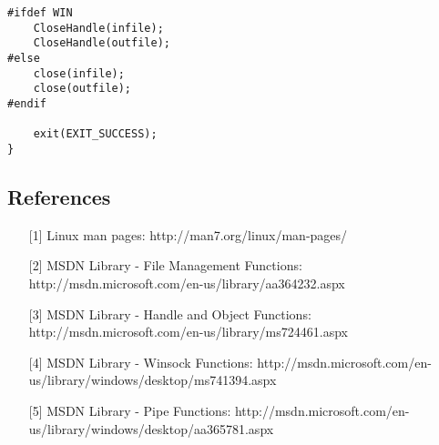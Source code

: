 \documentclass[letterpaper,10pt,fleqn]{article}
\numberwithin{equation}{section}
\begin{document}
\begin{verbatim}
#ifdef WIN
    CloseHandle(infile);
    CloseHandle(outfile);
#else
    close(infile);
    close(outfile);
#endif

    exit(EXIT_SUCCESS);
}
\end{verbatim}

\subsection*{References}

\begin{itemize}
    \item[{[}1{]}] Linux man pages: http://man7.org/linux/man-pages/
    \item[{[}2{]}] MSDN Library - File Management Functions: http://msdn.microsoft.com/en-us/library/aa364232.aspx
    \item[{[}3{]}] MSDN Library - Handle and Object Functions: http://msdn.microsoft.com/en-us/library/ms724461.aspx
    \item[{[}4{]}] MSDN Library - Winsock Functions: http://msdn.microsoft.com/en-us/library/windows/desktop/ms741394.aspx
    \item[{[}5{]}] MSDN Library - Pipe Functions: http://msdn.microsoft.com/en-us/library/windows/desktop/aa365781.aspx
\end{itemize}
\end{document}
